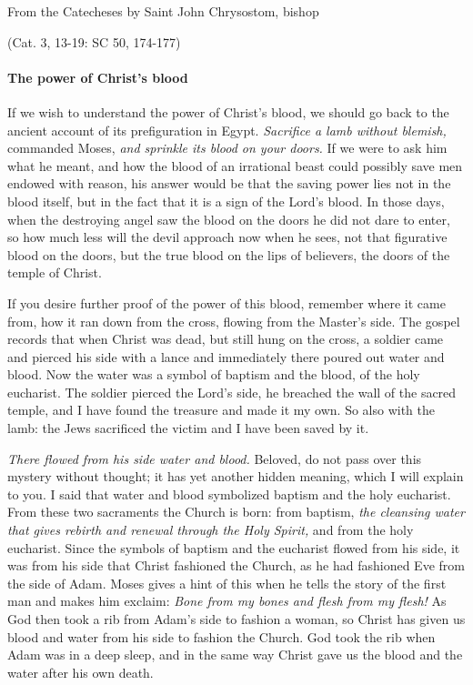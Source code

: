 From the Catecheses by Saint John Chrysostom, bishop

\par \hfill(Cat. 3, 13-19: SC 50, 174-177)

\paragraph{The power of Christ’s blood}

If we wish to understand the power of Christ’s blood, we should go back to the ancient account of its prefiguration in Egypt. \emph{Sacrifice a lamb without blemish,} commanded Moses, \emph{and sprinkle its blood on your doors.} If we were to ask him what he meant, and how the blood of an irrational beast could possibly save men endowed with reason, his answer would be that the saving power lies not in the blood itself, but in the fact that it is a sign of the Lord’s blood. In those days, when the destroying angel saw the blood on the doors he did not dare to enter, so how much less will the devil approach now when he sees, not that figurative blood on the doors, but the true blood on the lips of believers, the doors of the temple of Christ.

If you desire further proof of the power of this blood, remember where it came from, how it ran down from the cross, flowing from the Master’s side. The gospel records that when Christ was dead, but still hung on the cross, a soldier came and pierced his side with a lance and immediately there poured out water and blood. Now the water was a symbol of baptism and the blood, of the holy eucharist. The soldier pierced the Lord’s side, he breached the wall of the sacred temple, and I have found the treasure and made it my own. So also with the lamb: the Jews sacrificed the victim and I have been saved by it.

\emph{There flowed from his side water and blood.} Beloved, do not pass over this mystery without thought; it has yet another hidden meaning, which I will explain to you. I said that water and blood symbolized baptism and the holy eucharist. From these two sacraments the Church is born: from baptism, \emph{the cleansing water that gives rebirth and renewal through the Holy Spirit,} and from the holy eucharist. Since the symbols of baptism and the eucharist flowed from his side, it was from his side that Christ fashioned the Church, as he had fashioned Eve from the side of Adam. Moses gives a hint of this when he tells the story of the first man and makes him exclaim: \emph{Bone from my bones and flesh from my flesh!} As God then took a rib from Adam’s side to fashion a woman, so Christ has given us blood and water from his side to fashion the Church. God took the rib when Adam was in a deep sleep, and in the same way Christ gave us the blood and the water after his own death.

